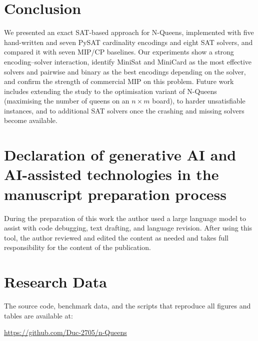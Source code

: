 \documentclass[a4paper,fleqn]{cas-sc}
\begin{document}
\section{Conclusion}\label{sec:conclusion}
We presented an exact SAT-based approach for N-Queens, implemented with five
hand-written and seven PySAT cardinality encodings and eight SAT solvers, and
compared it with seven MIP/CP baselines. Our experiments show a strong
encoding--solver interaction, identify MiniSat and MiniCard as the most effective
solvers and pairwise and binary as the best encodings depending on the solver,
and confirm the strength of commercial MIP on this problem. Future work includes
extending the study to the optimisation variant of N-Queens (maximising the
number of queens on an $n\times m$ board), to harder unsatisfiable instances, and
to additional SAT solvers once the crashing and missing solvers become available.

\section*{Declaration of generative AI and AI-assisted technologies in the
manuscript preparation process}
During the preparation of this work the author used a large language model to
assist with code debugging, text drafting, and language revision. After using
this tool, the author reviewed and edited the content as needed and takes full
responsibility for the content of the publication.




\section*{Research Data}
The source code, benchmark data, and the scripts that reproduce all figures and
tables are available at:
\begin{center}
\url{https://github.com/Duc-2705/n-Queens}
\end{center}
\end{document}
